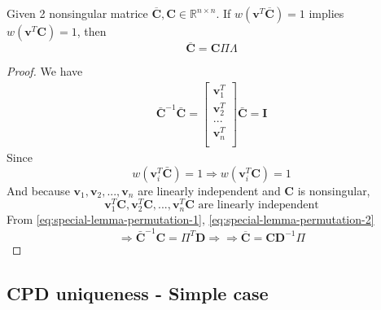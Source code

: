 \documentclass[11pt,a4paper]{article}
\begin{document}
\begin{lemma}
        Given 2 nonsingular matrice $\overline{\mathbf{C}}, \mathbf{C} \in \mathbb{R}^{n\times n}$. If $w(\mathbf{v}^T\overline{\mathbf{C}}) = 1$ implies $w(\mathbf{v}^T\mathbf{C})=1$, then
        \[
        \overline{\mathbf{C}} = \mathbf{C}\Pi\Lambda
        \] 
\end{lemma}
\begin{proof}
    We have
    \begin{align*}
    \bar{\mathbf{C}}^{-1}\bar{\mathbf{C}} = 
    \begin{bmatrix}
        \mathbf{v}_1^T \\
        \mathbf{v}_2^T \\
        ... \\
        \mathbf{v}_n^T \\
    \end{bmatrix} \bar{\mathbf{C}} = \mathbf{I}
    \end{align*} 
    Since 
    \begin{equation}
        \label{eq:special-lemma-permutation-1}
    w(\mathbf{v}_i^T\bar{\mathbf{C}}) = 1 \Rightarrow w(\mathbf{v}_i^T\mathbf{C}) = 1
\end{equation}
    And because $\mathbf{v}_1, \mathbf{v}_2, ..., \mathbf{v}_n$ are linearly independent and $\mathbf{C}$ is nonsingular, 
    \begin{equation}
        \label{eq:special-lemma-permutation-2}
    \mathbf{v}_1^T\mathbf{C}, \mathbf{v}_2^T\mathbf{C}, ..., \mathbf{v}_n^T\mathbf{C} \text{ are linearly independent}
\end{equation} 
From \ref{eq:special-lemma-permutation-1}, \ref{eq:special-lemma-permutation-2}
    \[
    \Rightarrow \bar{\mathbf{C}}^{-1}\mathbf{C} = \Pi^T\mathbf{D} \Rightarrow \Rightarrow \overline{\mathbf{C}} = \mathbf{C}\mathbf{D}^{-1}\Pi
    \] 
\end{proof}


\subsection{CPD uniqueness - Simple case}%
\label{sub:cpd_uniqueness_simple_case}
\end{document}
